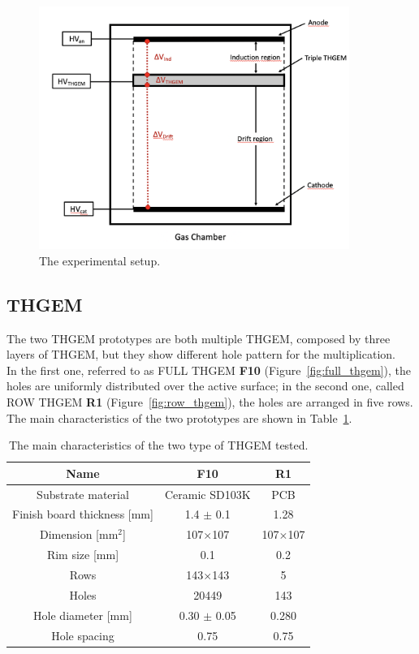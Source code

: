 \documentclass[a4paper, 11 pt]{article}
\begin{document}
\begin{figure}
	\centering
	\includegraphics[width=0.9\textwidth]{Immagini/schema_apparato_2.png}
	\caption{The experimental setup.}
	\label{fig:schema_apparato_2}
\end{figure}

\subsection{THGEM}

The two THGEM prototypes are both multiple THGEM, composed by three layers of THGEM, but they show 
different hole pattern for the multiplication.\\
In the first one, referred to as FULL THGEM \textbf{F10} (Figure~\ref{fig:full_thgem}), the holes 
are uniformly distributed over the active surface; in the second one, called ROW THGEM \textbf{R1} 
(Figure~\ref{fig:row_thgem}), the holes are arranged in five rows.\\
The main characteristics of the two prototypes are shown in Table~\ref{tab:thgem}.\\

\begin{table} [b!]
	\begin{center}
		\renewcommand{\arraystretch}{1.2}
\begin{tabular}{|c|c|c|}
\hline 
\textbf{Name} & \textbf{F10} & \textbf{R1} \\ 
\hline 
Substrate material & Ceramic SD103K & PCB  \\ 
\hline 
Finish board thickness [mm] & 1.4 $\pm$ 0.1 & 1.28 \\ 
\hline 
Dimension [$\mbox{mm}^2$] & 107$\times$107 & 107$\times$107 \\ 
\hline 
Rim size [mm] & 0.1 & 0.2  \\ 
\hline  
Rows & 143$\times$143 & 5 \\ 
\hline 
Holes & 20449 & 143 \\ 
\hline 
Hole diameter [mm] & 0.30 $\pm$ 0.05 & 0.280 \\ 
\hline
Hole spacing & 0.75 & 0.75 \\ 
\hline
\end{tabular} 
	\end{center}
	\caption{The main characteristics of the two type of THGEM tested.} \label{tab:thgem}
\end{table}
\end{document}
